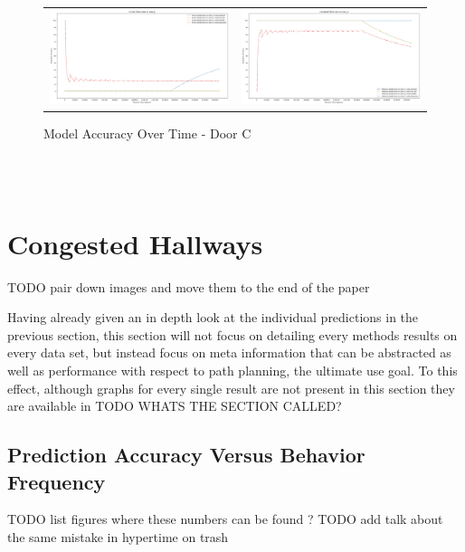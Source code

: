 \begin{figure}
  \begin{tabular}{cc}
    {\includegraphics[width = 3in]{images/results/Future_Predictions_on_door_C.png}} &
    {\includegraphics[width = 3in]{images/results/Historical_Predictions_on_door_C.png}} \\
  \end{tabular}
  \caption{Model Accuracy Over Time - Door C}
\end{figure}\\ \\


\section{ Congested Hallways }
TODO pair down images and move them to the end of the paper

Having already given an in depth look at the individual predictions in the
previous section, this section will not focus on detailing every methods results on every data set,
but instead focus on meta information that can be abstracted as well as
performance with respect to path planning, the ultimate use goal.
To this effect, although graphs for every single result are not
present in this section they are available in TODO WHATS THE SECTION CALLED? \\

\subsection{ Prediction Accuracy Versus Behavior Frequency }
TODO list figures where these numbers can be found ?
TODO add talk about the same mistake in hypertime on trash

